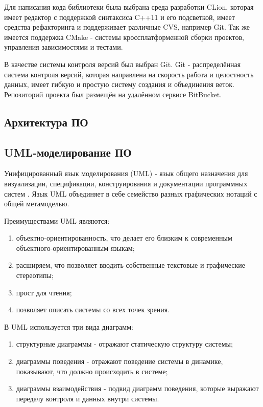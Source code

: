 Для написания кода библиотеки была выбрана среда разработки CLion, которая имеет редактор с поддержкой синтаксиса C++11 и его подсветкой, имеет средства рефакторинга и поддерживает различные CVS, например Git. Так же имеется поддержка CMake - системы кроссплатформенной сборки проектов, управления зависимостями и тестами.

В качестве системы контроля версий был выбран Git. Git - распределённая система контроля версий, которая направлена на скорость работа и целостность данных, имеет гибкую и простую систему создания и объединения веток. Репозиторий проекта был размещён на удалённом сервисе BitBucket.

\subsection{Архитектура ПО}

\subsection{UML-моделирование ПО}

Унифицированный язык моделирования (UML) - язык общего назначения для визуализации, спецификации, конструирования и документации программных систем \cite{UML_USER_GUIDE_2ND}. Язык UML объединяет в себе семейство разных графических нотаций с общей метамоделью. 

Преимуществами UML являются:

\begin{enumerate}
    \item объектно-ориентированность, что делает его близким к современным объектного-ориентированным языкам;
    \item расширяем, что позволяет вводить собственные текстовые и графические стереотипы;
    \item прост для чтения;
    \item позволяет описать системы со всех точек зрения.
\end{enumerate}

В UML используется три вида диаграмм:

\begin{enumerate}
    \item структурные диаграммы - отражают статическую структуру системы;
    \item диаграммы поведения - отражают поведение системы в динамике, показывают, что должно происходить в системе;
    \item диаграммы взаимодействия - подвид диаграмм поведения, которые выражают передачу контроля и данных внутри системы.
\end{enumerate} 

